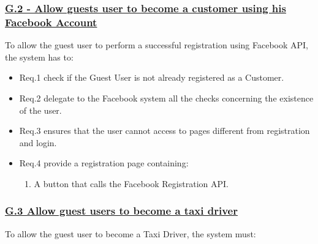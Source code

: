 \documentclass{report}
\begin{document}
			\subsubsection{\lbrack \hyperref[sec:g2]{G.2 - Allow guests user to become a customer using his Facebook Account}\rbrack}\label{sec:frs2}
			To allow the guest user to perform a successful registration using Facebook API, the system has to:

				\begin{itemize}
					\item \lbrack Req.1\rbrack \label{sec:fr1_g2} check if the Guest User is not already registered as a Customer.
					\item \lbrack Req.2\rbrack \label{sec:fr2_g2} delegate to the Facebook system all the checks concerning the existence of the user.
					\item \lbrack Req.3\rbrack \label{sec:fr3_g2} ensures that the user cannot access to pages different from registration and login.
 					\item \lbrack Req.4\rbrack \label{sec:fr4_g2} provide a registration page containing:
						\begin{enumerate}
							\item A button that calls the Facebook Registration API.
						\end{enumerate}
				\end{itemize}

			\subsubsection{\lbrack \hyperref[sec:g3]{G.3 Allow guest users to become a taxi driver}\rbrack}\label{sec:frs3}
			To allow the guest user to become a Taxi Driver, the system must:

\end{document}
